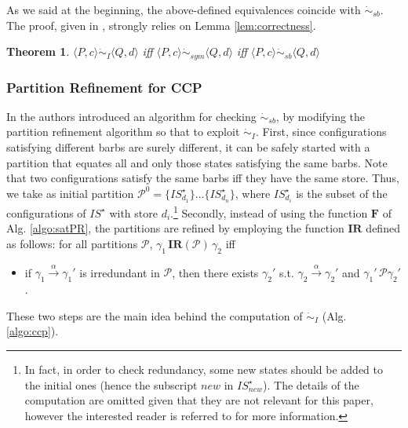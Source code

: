 \documentclass[copyright,creativecommons]{eptcs}
\newcommand{\rrarrow}{\longrightarrow}
\newcommand{\pairccp}[2]{\langle #1,#2 \rangle}
\newcommand{\trans}[1]{\stackrel{#1}{\rrarrow}}
\newcommand{\tr}[1]{\trans{#1}}
\newcommand{\satbis}{\dot{\sim}_{sb}}
\newcommand{\satstbisim}{\dot{\sim}_{sb}}
\newtheorem{theorem}{Theorem}
\newcommand{\conf}[2]{\pairccp{#1}{#2}}
\newcommand{\irrbis}{\dot{\sim}_{I}}
\newcommand{\symbis}{\dot{\sim}_{sym}}
\begin{document}
As we said at the beginning, the above-defined equivalences coincide with $\satbis$. The proof, given in \cite{Aristizabal:12:SAC},
strongly relies on Lemma \ref{lem:correctness}.
\begin{theorem}
$\conf{P}{c}  \irrbis \conf{Q}{d}$  iff $\conf{P}{c} \symbis \conf{Q}{d}$ iff $\conf{P}{c} \satbis \conf{Q}{d}$
\end{theorem}













\subsubsection{Partition Refinement for CCP} \label{sssec:partRefCCP}

In \cite{Aristizabal:12:SAC} the authors introduced an algorithm for checking $\satstbisim$,
by modifying the partition refinement algorithm so that to exploit $\irrbis$.
First, since configurations satisfying different barbs are
surely different, it can be safely started with a partition that equates all and only those states
satisfying the same barbs. Note that two configurations satisfy the same barbs iff they have the same store.
Thus, we take as initial partition
$\mathcal{P}^0=\{IS^{\star}_{d_1}\}\dots \{IS^{\star}_{d_n}\}$, where $IS^{\star}_{d_i}$ is the subset of
the configurations of $IS^{\star}$ with store $d_i$.\footnote{In fact,
in order to check redundancy, some new states should be added to the initial ones (hence the subscript $new$ in $IS_{new}^{\star}$).
The details of the computation are omitted given that they are not relevant for this paper,
however the interested reader is referred to \cite{Aristizabal:12:SAC} for more information.}
Secondly, instead of using the function $\mathbf{F}$ of Alg. \ref{algo:satPR},
the partitions are refined by employing the function $\mathbf{IR}$ defined as follows:
for all partitions $\mathcal{P}$,
$\gamma_1 \, \mathbf{IR}(\mathcal{P})\, \gamma_2$ iff
\begin{itemize}
 \item if $\gamma_1\tr{\alpha}\gamma_1'$ is irredundant in $\mathcal{P}$, then there exists $\gamma_2'$ s.t. $\gamma_2\tr{\alpha}\gamma_2'$ and  $\gamma_1'\, \mathcal{P} \gamma_2'$.
\end{itemize}
These two steps are the main idea behind the computation of $\irrbis$ (Alg. \ref{algo:ccp}).
\end{document}
